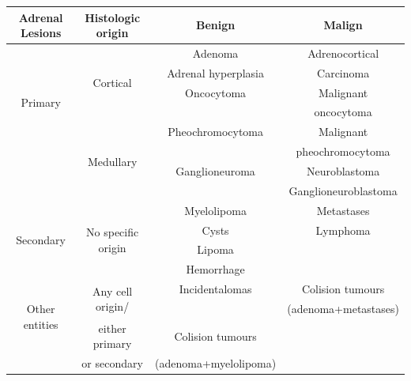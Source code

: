 \documentclass{article}
\begin{document}
\begin{table}[]
    \centering
    \begin{tabular}{cccc}\toprule
        \textbf{Adrenal Lesions}        & \textbf{Histologic origin}          & \textbf{Benign}       & \textbf{Malign}      \\
        \midrule
        \multirow{6}{*}{Primary}        & \multirow{4}{*}{Cortical}           & Adenoma               & Adrenocortical       \\
                                        &                                     & Adrenal hyperplasia   & Carcinoma            \\
                                        &                                     & Oncocytoma            & Malignant            \\
                                        &                                     &                       & oncocytoma           \\
        \cmidrule(lr){2-4}
                                        & \multirow{4}{*}{Medullary}          & Pheochromocytoma      & Malignant            \\
                                        &                                     &                       & pheochromocytoma     \\
                                        &                                     & Ganglioneuroma        & Neuroblastoma        \\
                                        &                                     &                       & Ganglioneuroblastoma \\
        \midrule
        \multirow{4}{*}{Secondary}      & \multirow{4}{*}{No specific origin} & Myelolipoma           & Metastases           \\
                                        &                                     & Cysts                 & Lymphoma             \\
                                        &                                     & Lipoma                &                      \\
                                        &                                     & Hemorrhage            &                      \\
        \midrule
        \multirow{3}{*}{Other entities} & \multirow{2}{*}{Any cell origin/}   & Incidentalomas        & Colision tumours     \\
                                        &                                     &                       & (adenoma+metastases) \\
                                        & \multirow{1}{*}{either primary}     & Colision tumours      &                      \\
                                        & \multirow{1}{*}{or secondary}       & (adenoma+myelolipoma) &


\end{tabular}
\end{table}
\end{document}
